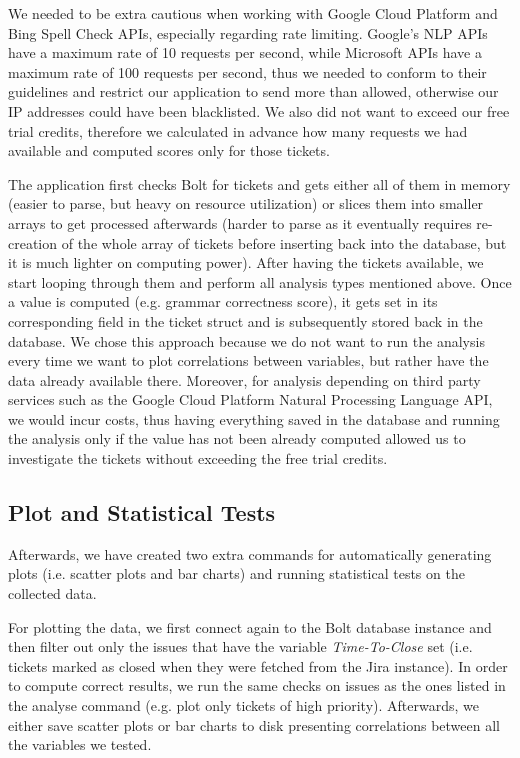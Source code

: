 \documentclass{mpaper}
\begin{document}
We needed to be extra cautious when working with Google Cloud Platform and Bing Spell Check APIs, especially 
regarding rate limiting. Google's NLP APIs have a maximum rate of 10 requests per second, while Microsoft APIs 
have a maximum rate of  100 requests per second, thus we needed to conform to their guidelines and restrict our 
application to send more than allowed, otherwise our IP addresses could have been blacklisted. We also did not want 
to exceed our free trial credits, therefore we calculated in advance how many requests we had available and computed 
scores only for those tickets. 

The application first checks Bolt for tickets and gets either all of them in memory (easier to parse, 
but heavy on resource utilization) or slices them into smaller arrays to get processed afterwards (harder to parse as it 
eventually requires re-creation of the whole array of tickets before inserting back into the database, but it is much 
lighter on computing power). After having the tickets available, we start looping through them and perform all 
analysis types mentioned above. Once a value is computed (e.g. grammar correctness score), it gets set in 
its corresponding field in the ticket struct and is subsequently stored back in the database. We chose this approach because 
we do not want to run the analysis every time we want to plot correlations between variables, but rather have the data 
already available there. Moreover, for analysis depending on third party services such as the Google Cloud Platform 
Natural Processing Language API, we would incur costs, thus having everything saved in the database and running the 
analysis only if the value has not been already computed allowed us to investigate the tickets without exceeding the 
free trial credits.

\subsection{Plot and Statistical Tests}

Afterwards, we have created two extra commands for automatically generating plots (i.e. scatter plots and bar charts) and 
running statistical tests on the collected data. 

For plotting the data, we first connect again to the Bolt database instance and then filter out only the issues that have 
the variable \emph{Time-To-Close} set (i.e. tickets marked as closed when they were fetched from the Jira instance). 
In order to compute correct results, we run the same checks on issues as the ones listed in the analyse command (e.g. plot 
only tickets of high priority). Afterwards, we either save scatter plots or bar charts to disk presenting correlations 
between all the variables we tested.
\end{document}
